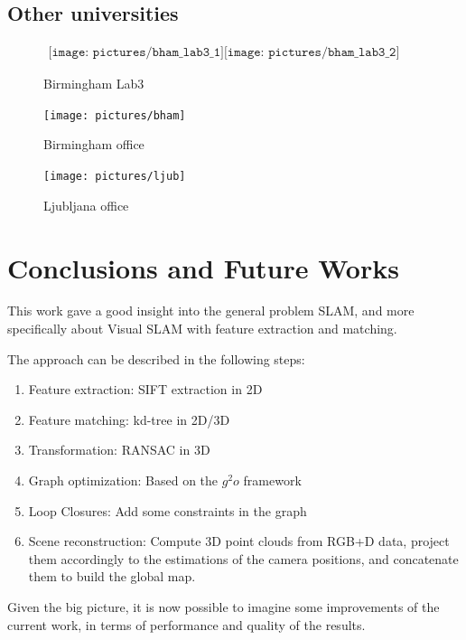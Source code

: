 \clearpage

\section{Other universities}

\begin{figure}[h]
\centering$
\begin{array}{c}
\texttt{[image: pictures/bham\_lab3\_1]}
\texttt{[image: pictures/bham\_lab3\_2]}
\end{array}$
\caption{Birmingham Lab3}
\end{figure}

\begin{figure}[h]
\centering
\texttt{[image: pictures/bham]}
\caption{Birmingham office}
\end{figure}

\begin{figure}[h]
\centering
\texttt{[image: pictures/ljub]}
\caption{Ljubljana office}
\end{figure}

\chapter{Conclusions and Future Works}
\label{chap:conclusion}

This work gave a good insight into the general problem SLAM, and more specifically about Visual SLAM with feature extraction and matching.

The approach can be described in the following steps:
\begin{enumerate}
\item Feature extraction: SIFT extraction in 2D
\item Feature matching: kd-tree in 2D/3D
\item Transformation: RANSAC in 3D
\item Graph optimization: Based on the $g^2o$ framework
\item Loop Closures: Add some constraints in the graph
\item Scene reconstruction: Compute 3D point clouds from RGB+D data, project them accordingly to the estimations of the camera positions, and concatenate them to build the global map.
\end{enumerate}

Given the big picture, it is now possible to imagine some improvements of the current work, in terms of performance and quality of the results.

